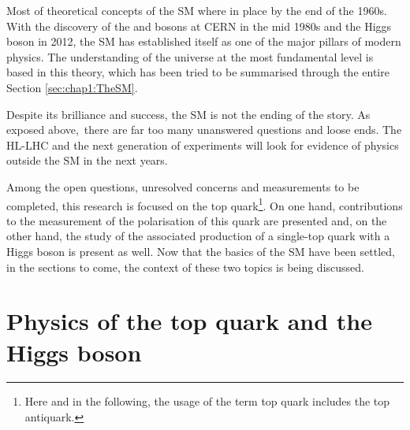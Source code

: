 Most of theoretical concepts of the SM where in place by the end of the 1960s. With the discovery of the \PW \cite{UA2:1983tsx_Wpm} and
\PZ \cite{UA1:1983mne_z0} bosons at CERN in the mid 1980s and the Higgs boson in 2012, the SM has established itself as one of the major
pillars of modern physics.  The understanding of the universe at the most fundamental level is based in this theory,
which has been tried to be summarised through the entire Section \ref{sec:chap1:TheSM}.

Despite its brilliance and success, the SM is not the ending of the story. As exposed above, there are far too many 
unanswered questions and loose ends. The HL-LHC \cite{ZurbanoFernandez:2020cco} and the 
next generation of experiments will look for evidence of physics outside the SM in the next years.

Among the open questions, unresolved concerns and measurements to be completed, this research is focused on the top 
quark\footnote{Here and in the following, the usage of the term top quark includes the top antiquark.}.
On one hand, contributions to the measurement of the polarisation of this quark are presented and, on the other hand,
the study of the associated production of a single-top quark with a Higgs boson is present as well. 
Now that the basics of the SM have been settled, in the sections to come, the context of these two topics
is being discussed. 











\chapter{Physics of the top quark and the Higgs boson}
\label{chap:topHiggsPhysics}

